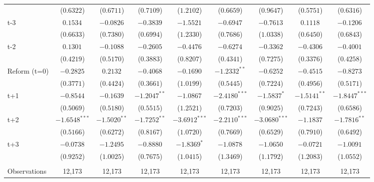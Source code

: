 \begin{landscape}
\begin{table}[htbp]
{\begin{tabular}{lcccccccc}
&     ($0.6322$) &     ($0.6711$) & ($0.7109$)& ($ 1.2102$)  &    ($0.6659$)   &   ($0.9647$) &    ($0.5751$)   &   ($0.6316$) \\
t-3 &     $ 0.1534^{} $ &     $ -0.0826^{} $ &  $ -0.3839^{} $  &  $ -1.5521^{} $  &     $ -0.6947^{} $ &     $ -0.7613^{} $ & $ 0.1118^{} $ & $ -0.1206^{} $   \\
&     ($0.6633$) &     ($0.7380$) & ($0.6994$)& ($ 1.2330$)  &    ($0.7686$)   &   ($1.0338$) &    ($0.6450$)   &   ($0.6843$) \\
t-2 &     $ 0.1301^{} $ &     $ -0.1088^{} $ &  $ -0.2605^{} $  &  $ -0.4476^{} $  &     $ -0.6274^{} $ &     $ -0.3362^{} $ & $ -0.4306^{} $ & $ -0.4001^{} $   \\
&     ($0.4219$) &     ($0.5170$) & ($0.3883$)& ($ 0.8207$)  &    ($0.4341$)   &   ($0.7275$) &    ($0.3376$)   &   ($0.4258$) \\
Reform (t=0) &     $ -0.2825^{} $ &     $ 0.2132^{} $ &   $ -0.4068^{} $   &   $ -0.1690^{} $  &     $ -1.2332^{**} $ &     $ -0.6252^{} $ & $ -0.4515^{} $ & $ -0.8273^{} $   \\
&     ($0.3771$) &     ($0.4424$) & ($0.3661$)& ($ 1.0199$)  &    ($0.5445$)   &   ($0.7224$) &    ($0.4956$)   &   ($0.5171$) \\
t+1 &     $ -0.8544^{} $ &     $ -0.1639^{} $ &    $ -1.2047^{**} $ &    $ -1.0867^{} $ &     $ -2.4180^{***} $ &     $ -1.5837^{*} $  & $ -1.5141^{**} $ & $ -1.8447^{***} $   \\
&     ($0.5069$) &     ($0.5180$) & ($0.5515$)& ($ 1.2521$)  &    ($0.7203$)   &   ($0.9025$) &    ($0.7243$)   &   ($0.6586$) \\
t+2 &     $ -1.6548^{***} $ &     $ -1.5020^{**} $ &    $ -1.7252^{**} $ &    $ -3.6912^{***} $ &     $ -2.2110^{***} $ &     $ -3.0680^{***} $  & $ -1.1837^{} $ & $ -1.7816^{**} $   \\
&     ($0.5166$) &     ($0.6272$) & ($0.8167$)& ($ 1.0720$)  &    ($0.7669$)   &   ($0.6529$) &    ($0.7910$)   &   ($0.6492$) \\
t+3 &     $ -0.0738^{} $ &     $ -1.2495^{} $ &    $ -0.8880^{} $ &    $ -1.8369^{*} $ &     $ -1.0878^{} $ &     $ -1.0650^{} $  & $ -0.0721^{} $ & $ -1.0091^{} $   \\
&     ($0.9252$) &     ($1.0025$) & ($0.7675$)& ($ 1.0415$)  &    ($1.3469$)   &   ($1.1792$) &    ($1.2083$)   &   ($1.0552$) \\
\\
\addlinespace
Observations       &             12,173    &             12,173    &          12,173      &          12,173  &             12,173    &             12,173  &             12,173    &             12,173   \\

\end{tabular}}
\end{table}
\end{landscape}
